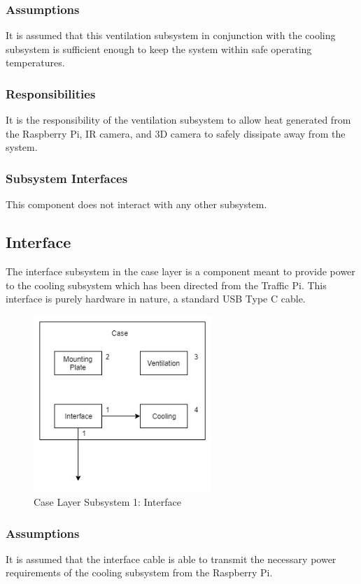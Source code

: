 \subsubsection{Assumptions}
It is assumed that this ventilation subsystem in conjunction with the cooling subsystem is sufficient enough to keep the system within safe operating temperatures.

\subsubsection{Responsibilities}
It is the responsibility of the ventilation subsystem to allow heat generated from the Raspberry Pi, IR camera, and 3D camera to safely dissipate away from the system.

\subsubsection{Subsystem Interfaces}
This component does not interact with any other subsystem.

\subsection{Interface}
The interface subsystem in the case layer is a component meant to provide power to the cooling subsystem which has been directed from the Traffic Pi. This interface is purely hardware in nature, a standard USB Type C cable. 

\begin{figure}[h!]
	\centering
 	\includegraphics[width=0.60\textwidth]{images/case_layer}
 \caption{Case Layer Subsystem 1: Interface}
\end{figure}

\subsubsection{Assumptions}
It is assumed that the interface cable is able to transmit the necessary power requirements of the cooling subsystem from the Raspberry Pi.

